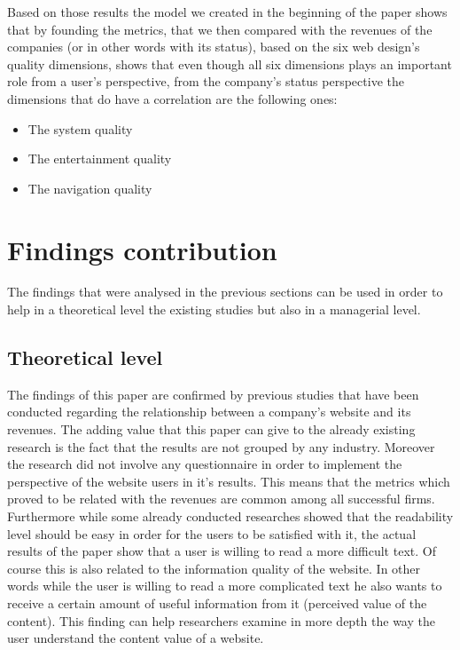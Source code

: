 \documentclass{book}
\begin{document}
Based on those results the model we created in the beginning of the paper shows that by founding the metrics, that we then compared with the revenues of the companies (or in other words with its status), based on the six web design's quality dimensions, shows that even though all six dimensions plays an important role from a user's perspective, from the company's status perspective the dimensions that do have a correlation are the following ones:
\begin{itemize}
\item The system quality
\item The entertainment quality
\item The navigation quality
\end{itemize}
\section{Findings contribution}
The findings that were analysed in the previous sections can be used in order to help in a theoretical level the existing studies but also in a managerial level.
\subsection{Theoretical level}
The findings of this paper are confirmed by previous studies that have been conducted regarding the relationship between a company's website and its revenues. The adding value that this paper can give to the already existing research is the fact that the results are not grouped by any industry. Moreover the research did not involve any questionnaire in order to implement the perspective of the website users in it's results. This means that the metrics which proved to be related with the revenues are common among all successful firms.\\
Furthermore while some already conducted researches showed that the readability level should be easy in order for the users to be satisfied with it, the actual results of the paper show that a user is willing to read a more difficult text. Of course this is also related to the information quality of the website. In other words while the user is willing to read a more complicated text he also wants to receive a certain amount of useful information from it (perceived value of the content). This finding can help researchers examine in more depth the way the user understand the content value of a website.
\end{document}
